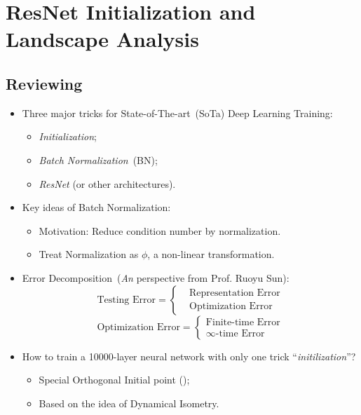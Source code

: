 \chapter{ResNet Initialization and Landscape Analysis}

\section{Reviewing}
\begin{itemize}
\item
Three major tricks for State-of-The-art~(SoTa) Deep Learning Training:
\begin{itemize}
\item
\emph{Initialization};
\item
\emph{Batch Normalization}~(BN);
\item
\emph{ResNet} (or other architectures).
\end{itemize}
\item
Key ideas of Batch Normalization:
\begin{itemize}
\item
Motivation: Reduce condition number by normalization.
\item
Treat Normalization as $\phi$, a non-linear transformation.
\end{itemize}
\item
Error Decomposition~(\emph{An} perspective from Prof. Ruoyu Sun):
\[
\text{Testing Error}=\left\{
\begin{aligned}
&\text{Representation Error}\\
&\text{Optimization Error}
\end{aligned}
\right.
\]
\[
\text{Optimization Error}=\left\{
\begin{aligned}
\text{Finite-time Error}\\
\text{$\infty$-time Error}
\end{aligned}
\right.
\]
\item
How to train a 10000-layer neural network with only one trick ``\emph{initilization}''?
\begin{itemize}
\item
Special Orthogonal Initial point ();
\item
Based on the idea of Dynamical Isometry.
\end{itemize}
\end{itemize}

